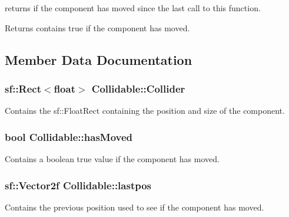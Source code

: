 returns if the component has moved since the last call to this function. 

\begin{DoxyReturn}{Returns}
contains true if the component has moved. 
\end{DoxyReturn}


\subsection{Member Data Documentation}
\hypertarget{class_collidable_a474de18f0027a4e089be1097f6d7bcc7}{
\subsubsection[{Collider}]{\setlength{\rightskip}{0pt plus 5cm}sf\-::\-Rect$<$float$>$ Collidable\-::\-Collider\hspace{0.3cm}{\ttfamily [protected]}}}\label{class_collidable_a474de18f0027a4e089be1097f6d7bcc7}


Contains the sf\-::\-Float\-Rect containing the position and size of the component. 

\hypertarget{class_collidable_afe5442fd3a82abe62b95e93248d5f4a1}{
\subsubsection[{has\-Moved}]{\setlength{\rightskip}{0pt plus 5cm}bool Collidable\-::has\-Moved\hspace{0.3cm}{\ttfamily [protected]}}}\label{class_collidable_afe5442fd3a82abe62b95e93248d5f4a1}


Contains a boolean true value if the component has moved. 

\hypertarget{class_collidable_ae50dbf8f9d1f584d3a5d5c3445fbe786}{
\subsubsection[{lastpos}]{\setlength{\rightskip}{0pt plus 5cm}sf\-::\-Vector2f Collidable\-::lastpos\hspace{0.3cm}{\ttfamily [protected]}}}\label{class_collidable_ae50dbf8f9d1f584d3a5d5c3445fbe786}


Contains the previous position used to see if the component has moved. 

